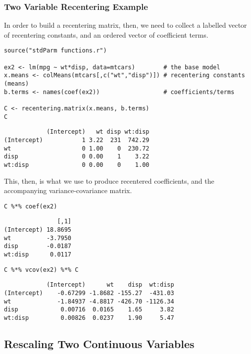 \documentclass[]{article}
\begin{document}
\subsubsection{Two Variable Recentering
Example}\label{two-variable-recentering-example}

In order to build a recentering matrix, then, we need to collect a
labelled vector of recentering constants, and an ordered vector of
coefficient terms.

\begin{verbatim}
source("stdParm functions.r")

ex2 <- lm(mpg ~ wt*disp, data=mtcars)        # the base model
x.means <- colMeans(mtcars[,c("wt","disp")]) # recentering constants (means)
b.terms <- names(coef(ex2))                  # coefficients/terms

C <- recentering.matrix(x.means, b.terms)
C
\end{verbatim}

\begin{verbatim}
            (Intercept)   wt disp wt:disp
(Intercept)           1 3.22  231  742.29
wt                    0 1.00    0  230.72
disp                  0 0.00    1    3.22
wt:disp               0 0.00    0    1.00
\end{verbatim}

This, then, is what we use to produce recentered coefficients, and the
accompanying variance-covariance matrix.

\begin{verbatim}
C %*% coef(ex2)
\end{verbatim}

\begin{verbatim}
               [,1]
(Intercept) 18.8695
wt          -3.7950
disp        -0.0187
wt:disp      0.0117
\end{verbatim}

\begin{verbatim}
C %*% vcov(ex2) %*% C
\end{verbatim}

\begin{verbatim}
            (Intercept)      wt    disp  wt:disp
(Intercept)    -0.67299 -1.8682 -155.27  -431.03
wt             -1.84937 -4.8817 -426.70 -1126.34
disp            0.00716  0.0165    1.65     3.82
wt:disp         0.00826  0.0237    1.90     5.47
\end{verbatim}

\subsection{Rescaling Two Continuous
Variables}\label{rescaling-two-continuous-variables}
\end{document}
